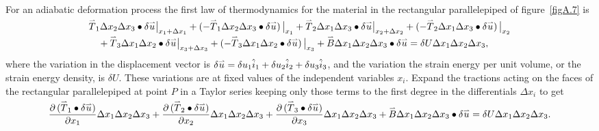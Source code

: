 \documentclass{AeroStructure-ERJohnson}
\def\harp#1{\smash{\mathord{\buildrel{\lower3pt\hbox{$\scriptscriptstyle\rightharpoonup$}}\over{#1}}}}
\begin{document}
For an adiabatic deformation process the first law of thermodynamics for the material in the rectangular parallelepiped of figure~\ref{figA.7} is
\begin{align}\label{eqA.99}
&\harp{T}_{1} \Delta x_{2} \Delta x_{3} \bullet \delta \harp{u}\big|_{x_{1}+\Delta x_{1}}+\left(-\harp{T}_{1} \Delta x_{2} \Delta x_{3} \bullet \delta \harp{u}\right)\big|_{x_{1}}+\harp{T}_{2} \Delta x_{1} \Delta x_{3} \bullet \delta \harp{u}\big|_{x_{2}+\Delta x_{2}}+\left(-\harp{T}_{2} \Delta x_{1} \Delta x_{3} \bullet \delta \harp{u}\right)\big|_{x_{2}}\nonumber\\
&\quad+\harp{T}_{3} \Delta x_{1} \Delta x_{2} \bullet \delta \harp{u}\big|_{x_{3}+\Delta x_{3}}+\left(-\harp{T}_{3} \Delta x_{1} \Delta x_{2} \bullet \delta \harp{u}\right)\big|_{x_{3}}+\harp{B} \Delta x_{1} \Delta x_{2} \Delta x_{3} \bullet \delta \harp{u}=\delta U \Delta x_{1} \Delta x_{2} \Delta x_{3},
\end{align}
where the variation in the displacement vector is $\delta \harp{u}=\delta u_{1} \hat{i}_{1}+\delta u_{2} \hat{i}_{2}+\delta u_{3} \hat{i}_{3}$, and the variation the strain energy per unit volume, or the strain energy density, is $\delta U$. These variations are at fixed values of the independent variables $x_{i}$. Expand the tractions acting on the faces of the rectangular parallelepiped at point $P$ in a Taylor series keeping only those terms to the first degree in the differentials $\Delta x_{i}$ to get
\begin{align}\label{eqA.100}
\frac{\partial\left(\harp{T}_{1} \bullet \delta \harp{u}\right)}{\partial x_{1}} \Delta x_{1} \Delta x_{2} \Delta x_{3}+\frac{\partial\left(\harp{T}_{2} \bullet \delta \harp{u}\right)}{\partial x_{2}} \Delta x_{1} \Delta x_{2} \Delta x_{3}+\frac{\partial\left(\harp{T}_{3} \bullet \delta \harp{u}\right)}{\partial x_{3}} \Delta x_{1} \Delta x_{2} \Delta x_{3}+\harp{B} \Delta x_{1} \Delta x_{2} \Delta x_{3}\bullet \delta \harp{u}=\delta U \Delta x_{1} \Delta x_{2} \Delta x_{3}.
\end{align}
\end{document}

